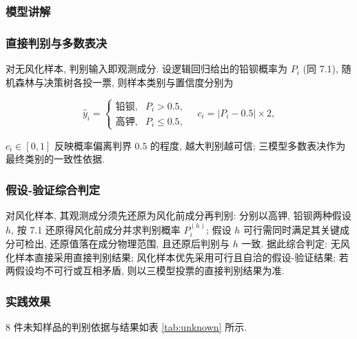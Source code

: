 \documentclass{ctexart}
\begin{document}
\subsubsection{模型讲解}

\subsubsection{直接判别与多数表决}

对无风化样本, 判别输入即观测成分. 设逻辑回归给出的铅钡概率为 $P_i$ (同 7.1), 随机森林与决策树各投一票, 则样本类别与置信度分别为

\begin{equation*}
\widehat{y}_i=\begin{cases}\text{铅钡},&P_i>0.5,\\\text{高钾},&P_i\le0.5,\end{cases}\quad{c}_i=\left|P_i-0.5\right|\times2,
\end{equation*}

$c_i\in\left[0,1\right]$ 反映概率偏离判界 $0.5$ 的程度, 越大判别越可信; 三模型多数表决作为最终类别的一致性依据.


\subsubsection{假设-验证综合判定}

对风化样本, 其观测成分须先还原为风化前成分再判别: 分别以高钾, 铅钡两种假设 $h$, 按 7.1 还原得风化前成分并求判别概率 $P_i^{\left(h\right)}$; 假设 $h$ 可行需同时满足其关键成分可检出, 还原值落在成分物理范围, 且还原后判别与 $h$ 一致. 据此综合判定: 无风化样本直接采用直接判别结果; 风化样本优先采用可行且自洽的假设-验证结果; 若两假设均不可行或互相矛盾, 则以三模型投票的直接判别结果为准.


\subsubsection{实践效果}

$8$ 件未知样品的判别依据与结果如表 \ref{tab:unknown} 所示.
\end{document}
